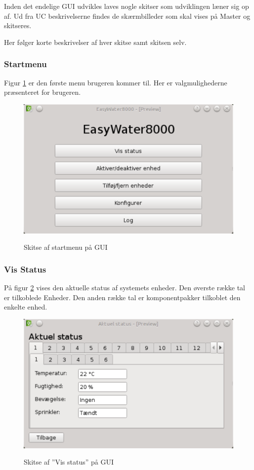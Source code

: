 
Inden det endelige GUI udvikles laves nogle skitser som udviklingen læner sig op af. Ud fra UC beskrivelserne findes de skærmbilleder som skal vises på Master og skitseres.

Her følger korte beskrivelser af hver skitse samt skitsen selv.

\subsubsection{Startmenu}
Figur \ref{fig:GUI-Startmenu} er den første menu brugeren kommer til. Her er valgmulighederne præsenteret for brugeren.

\begin{figure}[htbp] \centering
{\includegraphics[scale=0.5]{filer/pics/GUI/Start-menu}}
\caption{Skitse af startmenu på GUI}
\label{fig:GUI-Startmenu}
\end{figure}

\subsubsection{Vis Status}
På figur \ref{fig:GUI-aktuel-status} vises den aktuelle status af systemets enheder. Den øverste række tal er tilkoblede Enheder. Den anden række tal er komponentpakker tilkoblet den enkelte enhed.

\begin{figure}[htbp] \centering
{\includegraphics[scale=0.5]{filer/pics/GUI/Aktuel-status}}
\caption{Skitse af ''Vis status'' på GUI}
\label{fig:GUI-aktuel-status}
\end{figure}

